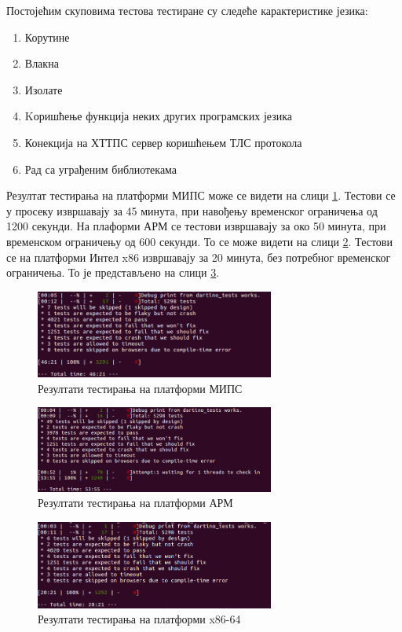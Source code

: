 \documentclass[12pt,oneside]{memoir}
\begin{document}
Постојећим скуповима тестова тестиране су следеће карактеристике језика:
\begin{enumerate}
\item Корутине
\item Влакна
\item Изолате
\item Kоришћење функција неких других програмских језика
\item Конекција на ХТТПС сервер коришћењем ТЛС протокола
\item Рад са уграђеним библиотекама
\end{enumerate}

Резултат тестирања на платформи МИПС може се видети на слици \ref{fig:mips}. Тестови се у просеку извршавају за 45 минута, при навођењу временског ограничења од 1200 секунди.
На плаформи АРМ се тестови извршавају за око 50 минута, при временском ограничењу од 600 секунди. То се може видети на слици \ref{fig:arm}.
Тестови се на платформи Интел x86 извршавају за 20 минута, без потребног временског ограничења. То је представљено на слици \ref{fig:x86}.

\begin{figure}[!ht]
  \centering
  \includegraphics[width=0.7\textwidth]{testovi-mips.png}
  \caption{Резултати тестирања на платформи МИПС}
  \label{fig:mips}
\end{figure}

\begin{figure}[!ht]
  \centering
  \includegraphics[width=0.7\textwidth]{testovi-arm.png}
  \caption{Резултати тестирања на платформи АРМ }
  \label{fig:arm}
\end{figure}

\begin{figure}[!ht]
  \centering
  \includegraphics[width=0.7\textwidth]{testovi_x64.png}
  \caption{Резултати тестирања на платформи x86-64}
  \label{fig:x86}
\end{figure}
\end{document}
